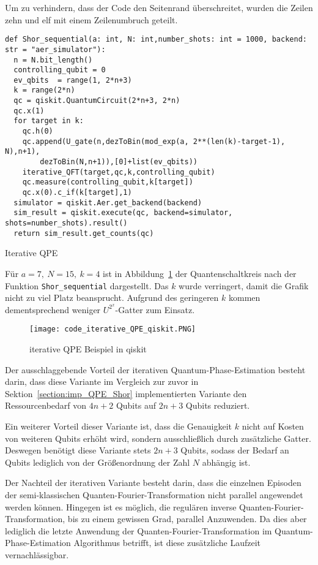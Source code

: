 Um zu verhindern, 
dass der Code den Seitenrand überschreitet, wurden die Zeilen zehn und elf mit einem Zeilenumbruch geteilt.

\begin{listing}[H]
\begin{verbatim}    
def Shor_sequential(a: int, N: int,number_shots: int = 1000, backend: str = "aer_simulator"):
  n = N.bit_length()
  controlling_qubit = 0
  ev_qbits  = range(1, 2*n+3)
  k = range(2*n)
  qc = qiskit.QuantumCircuit(2*n+3, 2*n) 
  qc.x(1)
  for target in k:
    qc.h(0)
    qc.append(U_gate(n,dezToBin(mod_exp(a, 2**(len(k)-target-1), N),n+1),
        dezToBin(N,n+1)),[0]+list(ev_qbits))
    iterative_QFT(target,qc,k,controlling_qubit)
    qc.measure(controlling_qubit,k[target])
    qc.x(0).c_if(k[target],1)
  simulator = qiskit.Aer.get_backend(backend)
  sim_result = qiskit.execute(qc, backend=simulator, shots=number_shots).result()
  return sim_result.get_counts(qc)
  \end{verbatim}
  \caption{Iterative QPE}
  \label{code:IterativeQPE}
\end{listing}

Für \(a = 7,~N=15,~k=4\) ist in Abbildung~\ref{fig:iterative_iQPE_qiskit} der Quantenschaltkreis nach der Funktion \texttt{Shor\_sequential} dargestellt.
Das \(k\) wurde verringert, damit die Grafik nicht zu viel Platz beansprucht.
Aufgrund des geringeren \(k\) kommen dementsprechend weniger \(U^{2^x}\)-Gatter zum Einsatz.

\begin{figure} [H]
  \centering
  \texttt{[image: code\_iterative\_QPE\_qiskit.PNG]}
  \caption{iterative QPE Beispiel in qiskit}
  \label{fig:iterative_iQPE_qiskit}
\end{figure}

Der ausschlaggebende Vorteil der iterativen Quantum-Phase-Estimation besteht darin, 
dass diese Variante im Vergleich zur zuvor in Sektion~\ref{section:imp_QPE_Shor} implementierten Variante den Ressourcenbedarf von \(4n+2\) Qubits auf \(2n+3\) Qubits reduziert.

Ein weiterer Vorteil dieser Variante ist, 
dass die Genauigkeit \(k\) nicht auf Kosten von weiteren Qubits erhöht wird, 
sondern ausschließlich durch zusätzliche Gatter.
Deswegen benötigt diese Variante stets \(2n+3\) Qubits, 
sodass der Bedarf an Qubits lediglich von der Größenordnung der Zahl \(N\) abhängig ist.

Der Nachteil der iterativen Variante besteht darin, 
dass die einzelnen Episoden der semi-klassischen Quanten-Fourier-Transformation nicht parallel angewendet werden können.
Hingegen ist es möglich, die regulären inverse Quanten-Fourier-Transformation, bis zu einem gewissen Grad, 
parallel Anzuwenden.
Da dies aber lediglich die letzte Anwendung der Quanten-Fourier-Transformation im Quantum-Phase-Estimation Algorithmus betrifft, 
ist diese zusätzliche Laufzeit vernachlässigbar.

